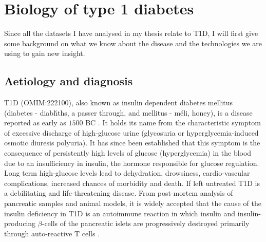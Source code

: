 \section{Biology of type 1 diabetes}

Since all the datasets I have analysed in my thesis relate to \gls{T1D}, I will first give some background on
what we know about the disease and the technologies we are using to gain new insight.

\subsection{Aetiology and diagnosis}

\Gls{T1D} (OMIM:222100), also known as insulin dependent diabetes mellitus (diabetes - \foreignlanguage{greek}{diab\'hths},
a passer through, and mellitus - \foreignlanguage{greek}{m\'eli}, honey), is a disease reported as early as $1500$ BC \citep{Poretsky:2010wr}.
It holds its name from the characteristic symptom of excessive discharge of high-glucose urine (glycosuria or hyperglycemia-induced osmotic diuresis polyuria).
It has since been established that this symptom is the consequence of persistently high levels of glucose (hyperglycemia) in the blood due to an insufficiency in insulin,
the hormone responsible for glucose regulation.
Long term high-glucose levels lead to dehydration, drowsiness, cardio-vascular complications, increased chances of morbidity and death.  
If left untreated T1D is a debilitating and life-threatening disease.
From post-mortem analysis of pancreatic samples and animal models,
it is widely accepted that the cause of the insulin deficiency in \gls{T1D} is an autoimmune reaction
in which insulin and insulin-producing $\beta$-cells of the pancreatic islets
are progressively destroyed primarily through auto-reactive T cells \citep{Todd:2010bl}.  

